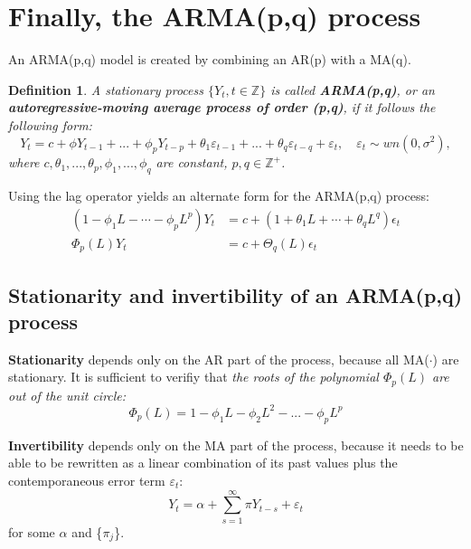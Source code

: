 \documentclass[11pt, a4paper]{report}
\theoremstyle{plain}
\theoremstyle{plain}
\newtheorem{defn}{Definition}[section]
\theoremstyle{remark}
\begin{document}
\section{Finally, the ARMA(p,q) process}

An ARMA(p,q) model is created by combining an AR(p) with a MA(q).

\begin{defn}
	A stationary process $\{Y_t, t \in \mathbb{Z} \}$ is called \textbf{ARMA(p,q)}, or an \textbf{autoregressive-moving average process of order (p,q)}, if it follows the following form:
	$$ Y_t = c + \phi Y_{t-1} + ... + \phi_p Y_{t-p} + \theta_1 \varepsilon_{t-1} + ... + \theta_q \varepsilon_{t-q} + \varepsilon_t, \hspace{1em} \varepsilon_t \sim wn(0, \sigma^2), $$
	where $c, \theta_1, ..., \theta_p, \phi_1, ..., \phi_q$ are constant, $p, q \in \mathbb{Z}^+$.
\end{defn}

Using the lag operator yields an alternate form for the ARMA(p,q) process:
$$\begin{aligned}
	\left(1-\phi_{1} L-\cdots-\phi_{p} L^{p}\right) Y_{t} &=c+\left(1+\theta_{1} L+\cdots+\theta_{q} L^{q}\right) \epsilon_{t} \\
	\Phi_{p}(L) Y_{t} &=c+\Theta_{q}(L) \epsilon_{t}
\end{aligned}$$

\subsection{Stationarity and invertibility of an ARMA(p,q) process}

\textbf{Stationarity} depends only on the AR part of the process, because all MA($\cdot$) are stationary. It is sufficient to verifiy that \textit{the roots of the polynomial $\Phi_p(L)$ are out of the unit circle:}
$$\Phi_p(L) = 1 - \phi_1 L - \phi_2 L^2 - ... - \phi_{p} L^p $$

\textbf{Invertibility} depends only on the MA part of the process, because it needs to be able to be rewritten as a linear combination of its past values plus the contemporaneous error term $\varepsilon_{t}$:
$$ Y_t = \alpha + \sum_{s=1}^{\infty} \pi Y_{t-s} + \varepsilon_{t} $$
for some $\alpha$ and \{$\pi_j$\}. 
\end{document}
